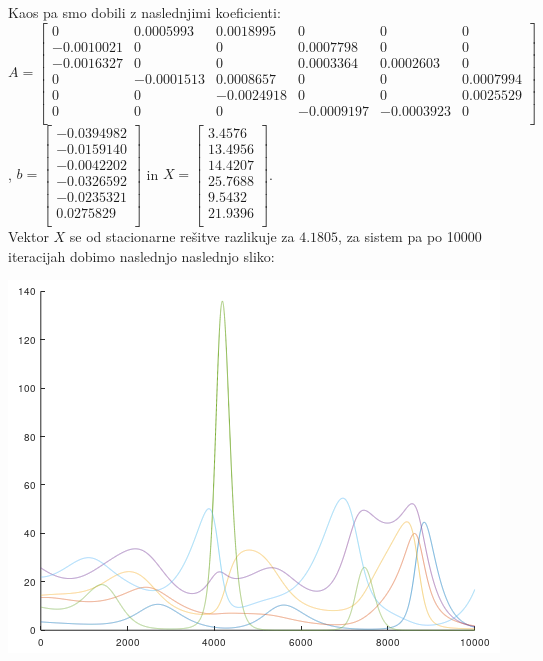 \documentclass[a4paper, 12pt]{article}
\begin{document}
Kaos pa smo dobili z naslednjimi koeficienti:\\
$ A =
\begin{bmatrix}
	0 & 0.0005993 & 0.0018995 & 0 & 0 & 0 \\
	-0.0010021 & 0 & 0 & 0.0007798 & 0 & 0 \\
	-0.0016327 & 0 & 0 & 0.0003364 & 0.0002603 & 0 \\
	0 & -0.0001513 & 0.0008657 & 0 & 0 & 0.0007994 \\
	0 & 0 & -0.0024918 & 0 & 0 & 0.0025529 \\
	0 & 0 & 0 & -0.0009197 & -0.0003923 & 0 \\
\end{bmatrix} $, 
$ b =
\begin{bmatrix}
	-0.0394982 \\
	-0.0159140 \\
	-0.0042202 \\
	-0.0326592 \\
	-0.0235321 \\
	0.0275829 \\
\end{bmatrix} $ in
$ X =
\begin{bmatrix}
	3.4576 \\
	13.4956 \\
	14.4207 \\
	25.7688 \\
	9.5432 \\
	21.9396 \\
\end{bmatrix} $. \\
Vektor $ X $ se od stacionarne rešitve razlikuje za $ 4.1805 $,
za sistem pa po 10000 iteracijah dobimo naslednjo naslednjo sliko:\\
\begin{center}
	\includegraphics{caos.png}
\end{center}
\end{document}
